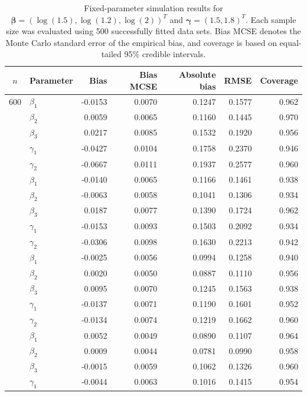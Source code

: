 \begin{table}[!htbp]
\caption[Fixed-parameter simulation results across five sample sizes]{Fixed-parameter simulation results for $\boldsymbol\beta=(\log(1.5),\log(1.2),\log(2))^{T}$ and $\boldsymbol\gamma=(1.5,1.8)^{T}$. Each sample size was evaluated using 500 successfully fitted data sets. Bias MCSE denotes the Monte Carlo standard error of the empirical bias, and coverage is based on equal-tailed 95\% credible intervals.}
\scriptsize
\centering
\begin{tabular}{clrrrrr}
\toprule
$n$ & Parameter & Bias & Bias MCSE & Absolute bias & RMSE & Coverage \\
\midrule
600
& $\beta_1$  & -0.0153 & 0.0070 & 0.1247 & 0.1577 & 0.962 \\
& $\beta_2$   &  0.0059 & 0.0065 & 0.1160 & 0.1445 & 0.970 \\
& $\beta_3$   &  0.0217 & 0.0085 & 0.1532 & 0.1920 & 0.956 \\
& $\gamma_1$  & -0.0427 & 0.0104 & 0.1758 & 0.2370 & 0.946 \\
& $\gamma_2$  & -0.0667 & 0.0111 & 0.1937 & 0.2577 & 0.960 \\
\addlinespace
800
& $\beta_1$  & -0.0140 & 0.0065 & 0.1166 & 0.1461 & 0.938 \\
& $\beta_2$   & -0.0063 & 0.0058 & 0.1041 & 0.1306 & 0.934 \\
& $\beta_3$   &  0.0187 & 0.0077 & 0.1390 & 0.1724 & 0.962 \\
& $\gamma_1$  & -0.0153 & 0.0093 & 0.1503 & 0.2092 & 0.934 \\
& $\gamma_2$  & -0.0306 & 0.0098 & 0.1630 & 0.2213 & 0.942 \\
\addlinespace
1000
& $\beta_1$  & -0.0025 & 0.0056 & 0.0994 & 0.1258 & 0.940 \\
& $\beta_2$   &  0.0020 & 0.0050 & 0.0887 & 0.1110 & 0.956 \\
& $\beta_3$   &  0.0095 & 0.0070 & 0.1245 & 0.1563 & 0.938 \\
& $\gamma_1$  & -0.0137 & 0.0071 & 0.1190 & 0.1601 & 0.952 \\
& $\gamma_2$  & -0.0134 & 0.0074 & 0.1219 & 0.1662 & 0.960 \\
\addlinespace
1200
& $\beta_1$  &  0.0052 & 0.0049 & 0.0890 & 0.1107 & 0.964 \\
& $\beta_2$   &  0.0009 & 0.0044 & 0.0781 & 0.0990 & 0.958 \\
& $\beta_3$   & -0.0015 & 0.0059 & 0.1062 & 0.1326 & 0.960 \\
& $\gamma_1$  & -0.0044 & 0.0063 & 0.1016 & 0.1415 & 0.954 \\

\end{tabular}
\end{table}
